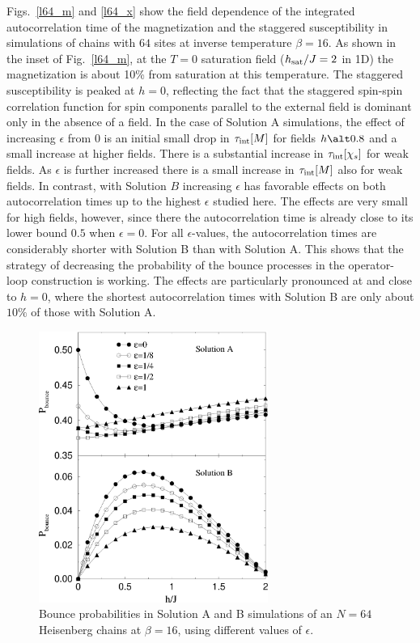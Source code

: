 \documentclass[10pt,pre,aps,twocolumn,showpacs,superscriptaddress,
floatfix]{revtex4}
\begin{document}
Figs.~\ref{l64_m} and \ref{l64_x} show the field dependence of the integrated 
autocorrelation time of the magnetization and the staggered susceptibility in 
simulations of chains with $64$ sites at inverse temperature $\beta=16$. As 
shown in the inset of Fig.~\ref{l64_m}, at the $T=0$ saturation field 
($h_{\rm sat}/J = 2$ in 1D) the magnetization is about 10\% from saturation 
at this temperature. The staggered susceptibility is peaked at $h=0$, 
reflecting the fact that the staggered spin-spin correlation function 
for spin components parallel to the external field is 
dominant only in the absence of a field.
In the case of Solution A simulations, the effect of increasing $\epsilon$ 
from $0$ is an initial small drop in $\tau_{\rm int}[M]$ for fields 
$h \alt 0.8$ and a small increase at higher fields. There is a substantial 
increase in $\tau_{\rm int}[\chi_s]$ for weak fields. As $\epsilon$ is further
increased there is a small increase in $\tau_{\rm int}[M]$ also for weak
fields. In contrast, with Solution $B$ increasing $\epsilon$ has favorable 
effects on both autocorrelation times up to the highest $\epsilon$ studied 
here. The effects are very small for high fields, however, since there the 
autocorrelation time is already close to its lower bound $0.5$ when 
$\epsilon=0$. For all $\epsilon$-values, the autocorrelation times are 
considerably shorter with Solution B than with Solution A. This shows that the 
strategy of decreasing the probability of the bounce processes in the 
operator-loop construction is working. The effects are particularly pronounced
at and close to $h = 0$, where the shortest autocorrelation times with 
Solution B are only about $10\%$ of those with Solution A. 

\begin{figure}
\includegraphics[clip,width=7.5cm]{fig15.eps}
\caption{Bounce probabilities in Solution A and B simulations of an 
$N=64$ Heisenberg chains at $\beta=16$, using different values 
of $\epsilon$.}
\label{bounce}
\end{figure}
\end{document}

